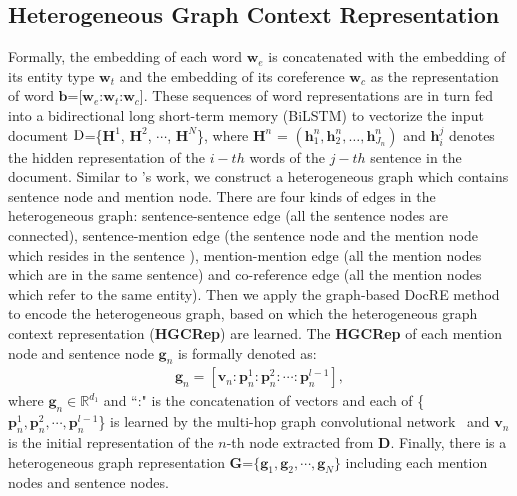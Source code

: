 \documentclass[11pt,a4paper]{article}
\begin{document}
\subsection{Heterogeneous Graph Context Representation}
\label{sec3-1}
Formally, the embedding of each word $\textbf{w}_e$ is concatenated with the embedding of its entity type $\textbf{w}_t$ and the embedding of its coreference $\textbf{w}_c$ as the representation of word $\textbf{b}$=[$\textbf{w}_e$:$\textbf{w}_t$:$\textbf{w}_c$].
These sequences of word representations are in turn fed into a bidirectional long short-term memory (BiLSTM) to vectorize the input document $\textup{D}$=\{$\textbf{H}^{1}$, $\textbf{H}^{2}$, $\cdots$, $\textbf{H}^{N}$\}, where $\textbf{H}^{n}$ = $(\textbf{h}^{n}_1, \textbf{h}^{n}_2, \dots, \textbf{h}^{n}_{J_n})$ and $\textbf{h}^{j}_i$ denotes the hidden representation of the $i-th$ words of the $j-th$ sentence in the document.
Similar to  \citeauthor{zeng-etal-2020-double}'s work, we construct a heterogeneous graph which contains sentence node and mention node.
There are four kinds of edges in the heterogeneous graph: sentence-sentence edge (all the sentence nodes are connected), sentence-mention edge (the sentence node and the mention node which resides in the sentence ), mention-mention edge (all the mention nodes which are in the same sentence) and co-reference edge (all the mention nodes which refer to the same entity).
Then we apply the graph-based DocRE method \cite{zeng-etal-2020-double} to encode the heterogeneous graph, based on which the heterogeneous graph context representation (\textbf{HGCRep}) are learned.
The \textbf{HGCRep} of each mention node and sentence node $\textbf{g}_n$ is formally denoted as:
\begin{equation}
\begin{aligned}
\textbf{g}_n =[\textbf{v}_n:\textbf{p}^{1}_{n}:\textbf{p}^{2}_{n}:\cdots:\textbf{p}^{l-1}_{n}],
\label{eq:InputOfCNN}
\end{aligned}
\end{equation}
where $\textbf{g}_n\in \mathbb{R}^{d_1}$ and ``:" is the concatenation of vectors and each of \{$\textbf{p}^{1}_{n}, \textbf{p}^{2}_{n}, \cdots, \textbf{p}^{l-1}_{n}$\} is learned by the multi-hop graph convolutional network~\cite{zeng-etal-2020-double} and $\textbf{v}_n$ is the initial representation of the $n$-th node extracted from $\textbf{D}$.
Finally, there is a heterogeneous graph representation $\textbf{G}$=$\{\textbf{g}_{1}, \textbf{g}_{2}, \cdots, \textbf{g}_{N}\}$ including each mention nodes and sentence nodes.
\end{document}
